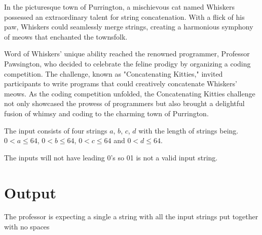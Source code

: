 In the picturesque town of Purrington, a mischievous cat named Whiskers possessed an extraordinary talent for string concatenation. With a flick of his paw, Whiskers could seamlessly merge strings, creating a harmonious symphony of meows that enchanted the townsfolk.

Word of Whiskers' unique ability reached the renowned programmer, Professor Pawsington, who decided to celebrate the feline prodigy by organizing a coding competition. The challenge, known as "Concatenating Kitties," invited participants to write programs that could creatively concatenate Whiskers' meows. As the coding competition unfolded, the Concatenating Kitties challenge not only showcased the prowess of programmers but also brought a delightful fusion of whimsy and coding to the charming town of Purrington.

\begin{Input}
The input consists of four strings $a$, $b$, $c$, $d$ with the length of strings being.
$0 < a\leq 64$,
$0 < b\leq 64$, 
$0 < c\leq 64$ and
$0 < d\leq 64$.

The inputs will not have leading 0's so 01 is not a valid input string.
\end{Input}

\section*{Output}
The professor is expecting a single a string with all the input strings put together with no spaces
